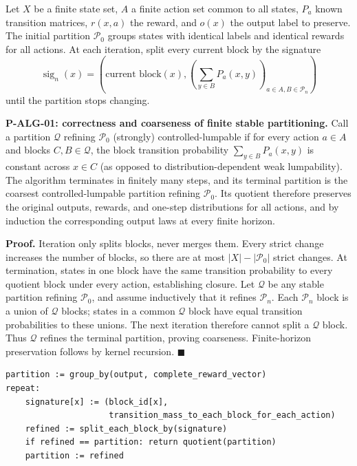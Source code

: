 \documentclass[
  english,
  11pt,
  oneside]{book}
\begin{document}
Let \(X\) be a finite state set, \(A\) a finite action set common to all states, \(P_a\) known transition matrices, \(r(x,a)\) the reward, and \(o(x)\) the output label to preserve. The initial partition \(\mathcal P_0\) groups states with identical labels and identical rewards for all actions. At each iteration, split every current block by the signature \[\operatorname{sig}_n(x)
=\left(\text{current block}(x),
\left(\sum_{y\in B}P_a(x,y)\right)_{a\in A,B\in\mathcal P_n}\right)\] until the partition stops changing.

\hypertarget{p-alg-01}{}\label{p-alg-01}

\textbf{P-ALG-01: correctness and coarseness of finite stable partitioning.} Call a partition \(\mathcal Q\) refining \(\mathcal P_0\) (strongly) controlled-lumpable if for every action \(a\in A\) and blocks \(C,B\in\mathcal Q\), the block transition probability \(\sum_{y\in B}P_a(x,y)\) is constant across \(x\in C\) (as opposed to distribution-dependent weak lumpability). The algorithm terminates in finitely many steps, and its terminal partition is the coarsest controlled-lumpable partition refining \(\mathcal P_0\). Its quotient therefore preserves the original outputs, rewards, and one-step distributions for all actions, and by induction the corresponding output laws at every finite horizon.

\textbf{Proof.} Iteration only splits blocks, never merges them. Every strict change increases the number of blocks, so there are at most \(|X|-|\mathcal P_0|\) strict changes. At termination, states in one block have the same transition probability to every quotient block under every action, establishing closure. Let \(\mathcal Q\) be any stable partition refining \(\mathcal P_0\), and assume inductively that it refines \(\mathcal P_n\). Each \(\mathcal P_n\) block is a union of \(\mathcal Q\) blocks; states in a common \(\mathcal Q\) block have equal transition probabilities to these unions. The next iteration therefore cannot split a \(\mathcal Q\) block. Thus \(\mathcal Q\) refines the terminal partition, proving coarseness. Finite-horizon preservation follows by kernel recursion. \(\blacksquare\)

\begin{verbatim}
partition := group_by(output, complete_reward_vector)
repeat:
    signature[x] := (block_id[x],
                     transition_mass_to_each_block_for_each_action)
    refined := split_each_block_by(signature)
    if refined == partition: return quotient(partition)
    partition := refined
\end{verbatim}
\end{document}
